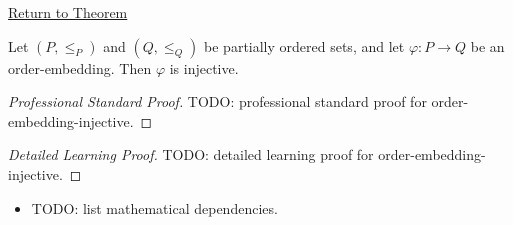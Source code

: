 \newpage
{}
\label{prf:order-embedding-injective}

\begin{remark*}[Return]
\hyperref[lem:order-embedding-injective]{Return to Theorem}
\end{remark*}

\begin{lemma*}
Let $(P, \leq_P)$ and $(Q, \leq_Q)$ be partially ordered sets, and let
$\varphi : P \to Q$ be an order-embedding.  Then $\varphi$ is injective.
\end{lemma*}

\begin{proof}[Professional Standard Proof]
\LRAProofBodyStart
TODO: professional standard proof for order-embedding-injective.
\end{proof}

\begin{proof}[Detailed Learning Proof]
\LRAProofBodyStart
TODO: detailed learning proof for order-embedding-injective.
\end{proof}

\begin{remark*}
\end{remark*}

\begin{dependencies}
\begin{itemize}
  \item TODO: list mathematical dependencies.
\end{itemize}
\end{dependencies}

\clearpage
